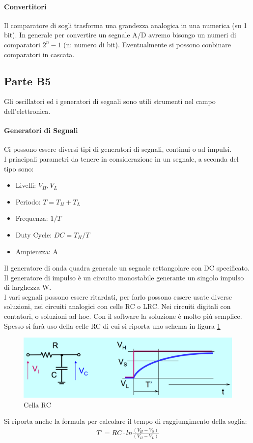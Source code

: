 \documentclass[12pt]{article}
\begin{document}
\paragraph{Convertitori}
Il comparatore di sogli trasforma una grandezza analogica in una numerica (su 1 bit). In generale per convertire un segnale A/D avremo bisongo un numeri di comparatori $2^n-1$ (n: numero di bit). Eventualmente si possono conbinare comparatori in cascata.

\subsection{Parte B5}\label{b5}
Gli oscillatori ed i generatori di segnali sono utili strumenti nel campo dell'elettronica.

\paragraph{Generatori di Segnali}
Ci possono essere diversi tipi di generatori di segnali, continui o ad impulsi.\\
I principali parametri da tenere in considerazione in un segnale, a seconda del tipo sono:
\begin{itemize}
  \item Livelli: $V_{H}, V_{L}$
  \item Periodo: $T = T_{H} + T_{L}$
  \item Frequenza: $1/T$
  \item Duty Cycle: $DC = T_{H}/T$
  \item Ampienzza: A
\end{itemize}
Il generatore di onda quadra generale un segnale rettangolare con DC specificato. Il generatore di impulso è un circuito monostabile generante un singolo impulso di larghezza W.\\
I vari segnali possono essere ritardati, per farlo possono essere usate diverse soluzioni, nei circuiti analogici con celle RC o LRC. Nei circuiti digitali con contatori, o soluzioni ad hoc. Con il software la soluzione è molto più semplice. Spesso si farà uso della celle RC di cui si riporta uno schema in figura \ref{fig:rc}
\begin{figure}[!hp]
  \includegraphics[width=\textwidth]{images/cellRC.png}
  \caption{Cella RC}
  \label{fig:rc}
\end{figure}
Si riporta anche la formula per calcolare il tempo di raggiungimento della soglia:\\
\begin{equation}
  \begin{gathered}
    T' = RC\cdot ln\frac {(V_{H}-V_{S})} {(V_{H}-V_{L})}
    \label{eq:tsoglie}
  \end{gathered}
\end{equation}
\end{document}
